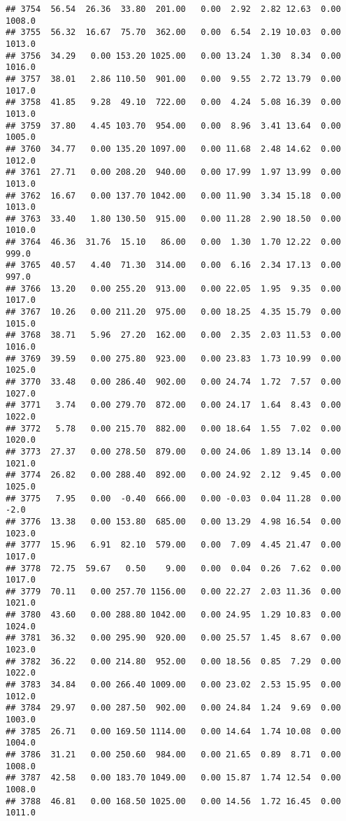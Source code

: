 \documentclass{article}\usepackage{graphicx, color}
\makeatletter
\newenvironment{kframe}{%
 \def\at@end@of@kframe{}%
 \ifinner\ifhmode%
  \def\at@end@of@kframe{\end{minipage}}%
  \begin{minipage}{\columnwidth}%
 \fi\fi%
 \def\FrameCommand##1{\hskip\@totalleftmargin \hskip-\fboxsep
 \colorbox{shadecolor}{##1}\hskip-\fboxsep
     \hskip-\linewidth \hskip-\@totalleftmargin \hskip\columnwidth}%
 \MakeFramed {\advance\hsize-\width
   \@totalleftmargin\z@ \linewidth\hsize
   \@setminipage}}%
 {\par\unskip\endMakeFramed%
 \at@end@of@kframe}
\newenvironment{knitrout}{}{} %
\makeatother
\begin{document}
\begin{knitrout}
\begin{kframe}
\begin{verbatim}
## 3754  56.54  26.36  33.80  201.00   0.00  2.92  2.82 12.63  0.00 1008.0
## 3755  56.32  16.67  75.70  362.00   0.00  6.54  2.19 10.03  0.00 1013.0
## 3756  34.29   0.00 153.20 1025.00   0.00 13.24  1.30  8.34  0.00 1016.0
## 3757  38.01   2.86 110.50  901.00   0.00  9.55  2.72 13.79  0.00 1017.0
## 3758  41.85   9.28  49.10  722.00   0.00  4.24  5.08 16.39  0.00 1013.0
## 3759  37.80   4.45 103.70  954.00   0.00  8.96  3.41 13.64  0.00 1005.0
## 3760  34.77   0.00 135.20 1097.00   0.00 11.68  2.48 14.62  0.00 1012.0
## 3761  27.71   0.00 208.20  940.00   0.00 17.99  1.97 13.99  0.00 1013.0
## 3762  16.67   0.00 137.70 1042.00   0.00 11.90  3.34 15.18  0.00 1013.0
## 3763  33.40   1.80 130.50  915.00   0.00 11.28  2.90 18.50  0.00 1010.0
## 3764  46.36  31.76  15.10   86.00   0.00  1.30  1.70 12.22  0.00  999.0
## 3765  40.57   4.40  71.30  314.00   0.00  6.16  2.34 17.13  0.00  997.0
## 3766  13.20   0.00 255.20  913.00   0.00 22.05  1.95  9.35  0.00 1017.0
## 3767  10.26   0.00 211.20  975.00   0.00 18.25  4.35 15.79  0.00 1015.0
## 3768  38.71   5.96  27.20  162.00   0.00  2.35  2.03 11.53  0.00 1016.0
## 3769  39.59   0.00 275.80  923.00   0.00 23.83  1.73 10.99  0.00 1025.0
## 3770  33.48   0.00 286.40  902.00   0.00 24.74  1.72  7.57  0.00 1027.0
## 3771   3.74   0.00 279.70  872.00   0.00 24.17  1.64  8.43  0.00 1022.0
## 3772   5.78   0.00 215.70  882.00   0.00 18.64  1.55  7.02  0.00 1020.0
## 3773  27.37   0.00 278.50  879.00   0.00 24.06  1.89 13.14  0.00 1021.0
## 3774  26.82   0.00 288.40  892.00   0.00 24.92  2.12  9.45  0.00 1025.0
## 3775   7.95   0.00  -0.40  666.00   0.00 -0.03  0.04 11.28  0.00   -2.0
## 3776  13.38   0.00 153.80  685.00   0.00 13.29  4.98 16.54  0.00 1023.0
## 3777  15.96   6.91  82.10  579.00   0.00  7.09  4.45 21.47  0.00 1017.0
## 3778  72.75  59.67   0.50    9.00   0.00  0.04  0.26  7.62  0.00 1017.0
## 3779  70.11   0.00 257.70 1156.00   0.00 22.27  2.03 11.36  0.00 1021.0
## 3780  43.60   0.00 288.80 1042.00   0.00 24.95  1.29 10.83  0.00 1024.0
## 3781  36.32   0.00 295.90  920.00   0.00 25.57  1.45  8.67  0.00 1023.0
## 3782  36.22   0.00 214.80  952.00   0.00 18.56  0.85  7.29  0.00 1022.0
## 3783  34.84   0.00 266.40 1009.00   0.00 23.02  2.53 15.95  0.00 1012.0
## 3784  29.97   0.00 287.50  902.00   0.00 24.84  1.24  9.69  0.00 1003.0
## 3785  26.71   0.00 169.50 1114.00   0.00 14.64  1.74 10.08  0.00 1004.0
## 3786  31.21   0.00 250.60  984.00   0.00 21.65  0.89  8.71  0.00 1008.0
## 3787  42.58   0.00 183.70 1049.00   0.00 15.87  1.74 12.54  0.00 1008.0
## 3788  46.81   0.00 168.50 1025.00   0.00 14.56  1.72 16.45  0.00 1011.0

\end{verbatim}
\end{kframe}
\end{knitrout}
\end{document}
